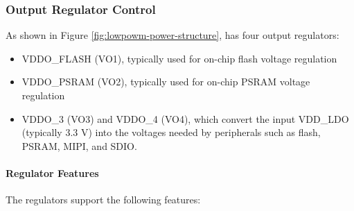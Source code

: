 \documentclass[main\_\_EN.tex]{subfiles}
\begin{document}
\subsubsection{Output Regulator Control}

As shown in Figure \ref{fig:lowpowm-power-structure}, \chipname{} has four output regulators:

\begin{itemize}
\item VDDO\_FLASH (VO1), typically used for on-chip flash voltage regulation
\item VDDO\_PSRAM (VO2), typically used for on-chip PSRAM voltage regulation
\item VDDO\_3 (VO3) and VDDO\_4 (VO4), which convert the input VDD\_LDO (typically 3.3 V) into the voltages needed by peripherals such as flash, PSRAM, MIPI, and SDIO.
\end{itemize}

\paragraph{Regulator Features}

The regulators support the following features:
\end{document}
